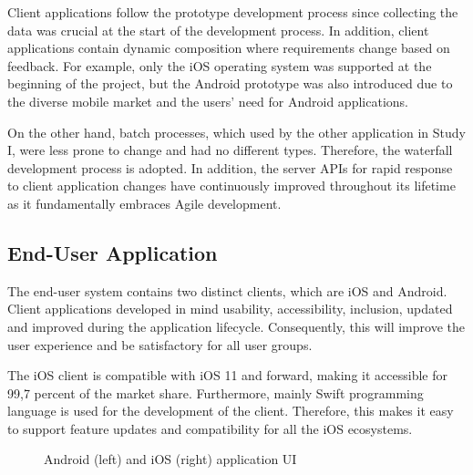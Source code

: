 Client applications follow the prototype development process since collecting the data was crucial at the start of the development process. In addition, client applications contain dynamic composition where requirements change based on feedback. For example, only the iOS operating system was supported at the beginning of the project, but the Android prototype was also introduced due to the diverse mobile market and the users' need for Android applications.

On the other hand, batch processes, which used by the other application in Study I, were less prone to change and had no different types. Therefore, the waterfall development process is adopted. In addition, the server APIs for rapid response to client application changes have continuously improved throughout its lifetime as it fundamentally embraces Agile development.

\subsection{End-User Application}

The end-user system contains two distinct clients, which are iOS and Android. Client applications developed in mind usability, accessibility, inclusion, updated and improved during the application lifecycle. Consequently, this will improve the user experience and be satisfactory for all user groups.

The iOS client is compatible with iOS 11 and forward, making it accessible for 99,7 percent of the market share. Furthermore, mainly Swift programming language is used for the development of the client. Therefore, this makes it easy to support feature updates and compatibility for all the iOS ecosystems. 

\begin{figure}[htbp]
\centering
{}
\caption{Android (left) and iOS (right) application UI}
\label{fig:UserApplicationUI}
\end{figure}

